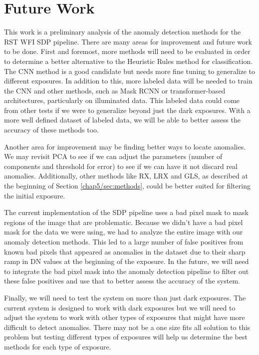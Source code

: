 \section{Future Work}
\label{chap5/sec:future}
This work is a preliminary analysis of the anomaly detection methods for the RST WFI SDP pipeline.
There are many areas for improvement and future work to be done.
First and foremost, more methods will need to be evaluated in order to determine a better alternative to the Heuristic Rules method for classification. 
The CNN method is a good candidate but needs more fine tuning to generalize to different exposures.
In addition to this, more labeled data will be needed to train the CNN and other methods, such as Mask RCNN or transformer-based architectures, particularly on illuminated data.
This labeled data could come from other tests if we were to generalize beyond just the dark exposures.
With a more well defined dataset of labeled data, we will be able to better assess the accuracy of these methods too. 

Another area for improvement may be finding better ways to locate anomalies.
We may revisit PCA to see if we can adjust the parameters (number of components and threshold for error) to see if we can have it not discard real anomalies. 
Additionally, other methods like RX, LRX and GLS, as described at the beginning of Section \ref{chap5/sec:methods}, could be better suited for filtering the initial exposure.

The current implementation of the SDP pipeline uses a bad pixel mask to mask regions of the image that are problematic. 
Because we didn't have a bad pixel mask for the data we were using, we had to analyze the entire image with our anomaly detection methods.
This led to a large number of false positives from known bad pixels that appeared as anomalies in the dataset due to their sharp ramp in DN values at the beginning of the exposure.
In the future, we will need to integrate the bad pixel mask into the anomaly detection pipeline to filter out these false positives and use that to better assess the accuracy of the system. 

Finally, we will need to test the system on more than just dark exposures.
The current system is designed to work with dark exposures but we will need to adjust the system to work with other types of exposures that might have more difficult to detect anomalies.
There may not be a one size fits all solution to this problem but testing different types of exposures will help us determine the best methods for each type of exposure.